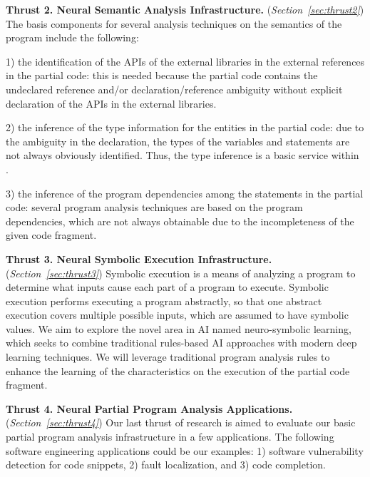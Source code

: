 \vspace{3pt}
\noindent \textbf{Thrust 2. Neural Semantic Analysis Infrastructure.}
({\em Section~\ref{sec:thrust2}}) The basis components for several
analysis techniques on the semantics of the program include the
following:

1) the identification of the APIs of the external libraries in the
external references in the partial code: this is needed because the
partial code contains the undeclared reference and/or
declaration/reference ambiguity without explicit declaration of the
APIs in the external libraries.

2) the inference of the type information for the entities in the
partial code: due to the ambiguity in the declaration, the types of
the variables and statements are not always obviously
identified. Thus, the type inference is a basic service within
{\tool}.

3) the inference of the program dependencies among the statements in
the partial code: several program analysis techniques are based on the
program dependencies, which are not always obtainable due to the
incompleteness of the given code fragment.

\vspace{3pt}
\noindent \textbf{Thrust 3. Neural Symbolic Execution Infrastructure.}
({\em Section~\ref{sec:thrust3}})
Symbolic execution is a means of analyzing a program to determine what
inputs cause each part of a program to execute. Symbolic execution
performs executing a program abstractly, so that one abstract
execution covers multiple possible inputs, which are assumed to have
symbolic values. We aim to explore the novel area in AI named
neuro-symbolic learning, which seeks to combine traditional
rules-based AI approaches with modern deep learning techniques.  We
will leverage traditional program analysis rules to enhance the
learning of the characteristics on the execution of the partial code
fragment.

\vspace{3pt}
\noindent \textbf{Thrust 4. Neural Partial Program Analysis
  Applications.}  ({\em Section~\ref{sec:thrust4}}) Our last thrust of research
is aimed to evaluate our basic partial program analysis infrastructure
in a few applications. The following software engineering
applications could be our examples: 1) software vulnerability detection for code snippets,
2) fault localization, and 3) code completion.



